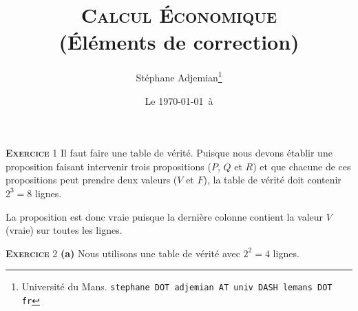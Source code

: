 \documentclass[10pt,a4paper,notitlepage]{article}
\newcommand{\exercice}[1]{\textsc{\textbf{Exercice}} #1}
\begin{document}
\title{\textsc{Calcul Économique}\\\textbf{(Éléments de correction)}}
\author{Stéphane Adjemian\thanks{Université du Mans. \texttt{stephane DOT adjemian AT univ DASH lemans DOT fr}}}
\date{Le \today\ à \thistime}

\maketitle

\exercice{1} Il faut faire une table de vérité. Puisque nous devons
établir une proposition faisant intervenir trois propositions ($P$,
$Q$ et $R$) et que chacune de ces propositions peut prendre deux
valeurs ($V$ et $F$), la table de vérité doit contenir $2^3=8$ lignes.

\begin{table}[H]
  \centering
{}
\end{table}

La proposition est donc vraie puisque la dernière colonne contient la
valeur $V$ (vraie) sur toutes les lignes.

\bigskip

\exercice{2} \textbf{(a)} Nous utilisons une table de vérité avec $2^2=4$ lignes.

\begin{table}[H]
  \centering
{}
\end{table}
\end{document}
